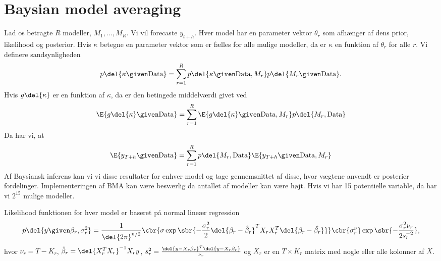 \chapter{Baysian model averaging}

Lad os betragte $R$ modeller, $M_1, \ldots, M_R$.
Vi vil forecaste $y_{t+h}$.
Hver model har en parameter vektor $\theta_r$ som afhænger af dens prior, likelihood og posterior.
Hvis $\kappa$ betegne en parameter vektor som er fælles for alle mulige modeller, da er $\kappa$ en funktion af $\theta_r$ for alle $r$.
Vi definere sandsynligheden
\begin{align*}
p \del{\kappa \given \text{Data}} = \sum_{r=1}^R p \del{\kappa \given \text{Data}, M_r} p \del{M_r \given \text{Data}}.
\end{align*}
Hvis $g \del{\kappa}$ er en funktion af $\kappa$, da er den betingede middelværdi givet ved
\begin{align*}
\E{g\del{\kappa} \given \text{Data}} = \sum_{r=1}^R \E{g \del{\kappa} \given \text{Data}, M_r} p \del{M_r, \text{Data}}
\end{align*}
Da har vi, at
\begin{align*}
\E{y_{T+h} \given \text{Data}} = \sum_{r=1}^R p \del{M_r, \text{Data}} \E{y_{T+h} \given \text{Data}, M_r}
\end{align*}
Af Baysiansk inferens kan vi vi disse resultater for enhver model og tage gennemsnittet af disse, hvor vægtene anvendt er posterier fordelinger.
Implementeringen af BMA kan være besværlig da antallet af modeller kan være højt.
Hvis vi har 15 potentielle  variable, da har vi $2^{15}$ mulige modeller.


Likelihood funktionen for hver model er baseret på normal lineær regression
\begin{align*}
p \del{y \given \beta_r, \sigma_r^2} = \frac{1}{\del{2 \pi}^{n/2}} \cbr{\sigma \exp \sbr{- \frac{\sigma_r^2}{2} \del{\beta_r - \hat{\beta}_r}^T X_r X_r^T \del{\beta_r - \hat{\beta_r}}}} \cbr{\sigma_r^\nu} \exp \sbr{- \frac{\sigma_r^2 \nu_r}{2 s_r^{-2}}},
\end{align*}
hvor $\nu_r = T-K_r$, $\hat{\beta}_r = \del{X_r^T X_r}^{-1}X_r y$, $s_r^2 = \frac{\del{y-X_r \beta_r}^T\del{y-X_r \beta_r}}{\nu_r}$ og $X_r$ er en $T \times K_r$ matrix med nogle eller alle kolonner af $X$.